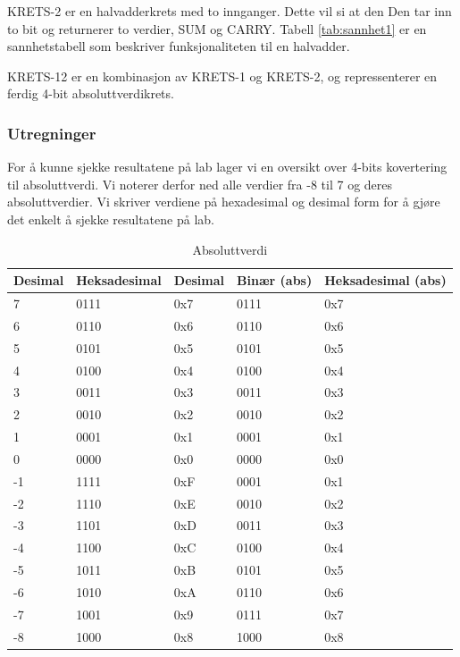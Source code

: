 \documentclass{article}
\begin{document}
KRETS-2 er en halvadderkrets med to innganger. Dette vil si at den Den tar inn to bit og returnerer to verdier, SUM og CARRY. Tabell \ref{tab:sannhet1} er en sannhetstabell som beskriver funksjonaliteten til en halvadder.

KRETS-12 er en kombinasjon av KRETS-1 og KRETS-2, og repressenterer en ferdig 4-bit absoluttverdikrets.

\subsubsection{Utregninger} %
For å kunne sjekke resultatene på lab lager vi en oversikt over 4-bits kovertering til absoluttverdi. Vi noterer derfor ned alle verdier fra -8 til 7 og deres absoluttverdier. Vi skriver verdiene på hexadesimal og desimal form for å gjøre det enkelt å sjekke resultatene på lab.

\begin{table}[h]
	\centering
	\caption{Absoluttverdi}
	\label{tab:abs1}
	\vspace{0.2cm}
	\begin{tabular} {| l | l | l || l | l |} \hline
		Desimal & Heksadesimal & Desimal & Binær (abs) & Heksadesimal (abs) \\ \hline
		7 & 0111 & 0x7 & 0111 & 0x7 \\ \hline
		6 & 0110 & 0x6 & 0110 & 0x6 \\ \hline
		5 & 0101 & 0x5 & 0101 & 0x5 \\ \hline
		4 & 0100 & 0x4 & 0100 & 0x4 \\ \hline
		3 & 0011 & 0x3 & 0011 & 0x3 \\ \hline
		2 & 0010 & 0x2 & 0010 & 0x2 \\ \hline
		1 & 0001 & 0x1 & 0001 & 0x1 \\ \hline
		0 & 0000 & 0x0 & 0000 & 0x0 \\ \hline
		-1 & 1111 & 0xF & 0001 & 0x1 \\ \hline
		-2 & 1110 & 0xE & 0010 & 0x2 \\ \hline
		-3 & 1101 & 0xD & 0011 & 0x3 \\ \hline
		-4 & 1100 & 0xC & 0100 & 0x4 \\ \hline
		-5 & 1011 & 0xB & 0101 & 0x5 \\ \hline
		-6 & 1010 & 0xA & 0110 & 0x6 \\ \hline
		-7 & 1001 & 0x9 & 0111 & 0x7 \\ \hline
		-8 & 1000 & 0x8 & 1000 & 0x8 \\ \hline
	\end{tabular}
\end{table}
\end{document}
